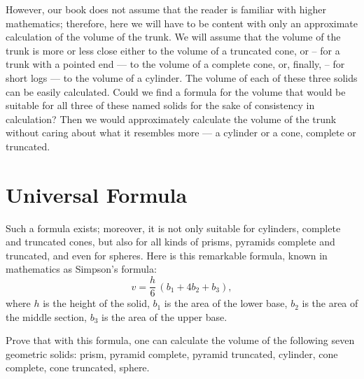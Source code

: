 However, our book does not assume that the reader is familiar with higher mathematics; therefore, here we will have to be content with only an approximate calculation of the volume of the trunk. We will assume that the volume of the trunk is more or less close either to the volume of a truncated cone, or -- for a trunk with a pointed end — to the volume of a complete cone, or, finally, -- for short logs — to the volume of a cylinder. The volume of each of these three solids can be easily calculated. Could we find a formula for the volume that would be suitable for all three of these named solids for the sake of consistency in calculation? Then we would approximately calculate the volume of the trunk without caring about what it resembles more — a cylinder or a cone, complete or truncated.

\clearpage

\section{Universal Formula}
\label{sec-1.11}

Such a formula exists; moreover, it is not only suitable for cylinders, complete and truncated cones, but also for all kinds of prisms, pyramids complete and truncated, and even for spheres. Here is this remarkable formula, known in mathematics as Simpson's formula:
\begin{equation*}
v = \frac{h}{6}\, (b_{1} + 4b_{2} + b_{3}),
\end{equation*}
where $h$ is the height of the solid, $b_{1}$ is the area of the lower base, $b_{2}$ is the area of the middle section, $b_{3}$ is the area of the upper base.

\ques Prove that with this formula, one can calculate the volume of the following seven geometric solids: prism, pyramid complete, pyramid truncated, cylinder, cone complete, cone truncated, sphere.

